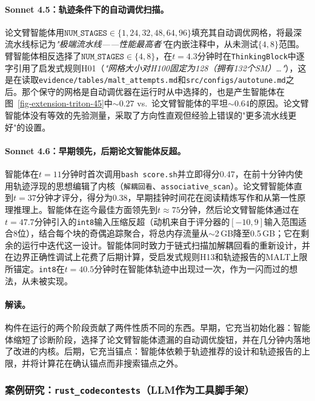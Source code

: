 \paragraph{Sonnet 4.5：轨迹条件下的自动调优扫描。}
论文臂智能体用$\texttt{NUM\_STAGES} \in \{1, 24, 32, 48, 64, 96\}$填充其自动调优网格，将最深流水线标记为\emph{"极端流水线——性能最高者"}在内嵌注释中，从未测试$\{4, 8\}$范围。\ara{}臂智能体相反选择了$\texttt{NUM\_STAGES} \in \{4, 8\}$，在$t = 4.3$分钟时在\texttt{ThinkingBlock}中逐字引用了启发式规则H01（\emph{"网格大小对H100固定为128（拥有132个SM）…"}），这是在读取\texttt{evidence/tables/malt\_attempts.md}和\texttt{src/configs/autotune.md}之后。那个保守的网格是自动调优器在运行时从中选择的，也是产生\ara{}智能体在图~\ref{fig-extension-triton-45}中$\sim 0.27$ vs.\ 论文臂智能体的平坦$\sim 0.64$的原因。论文臂智能体没有等效的先验测量，采取了方向性直观但经验上错误的"更多流水线更好"的设置。

\paragraph{Sonnet 4.6：早期领先，后期论文智能体反超。}
\ara{}智能体在$t = 11$分钟时首次调用\texttt{bash score.sh}并立即得分0.47，在前十分钟内使用轨迹浮现的思想编辑了内核（\texttt{解耦回看}、\texttt{associative\_scan}）。论文臂智能体直到$t = 37$分钟才评分，得分为0.38，早期挂钟时间花在阅读精炼写作和从第一性原理推理上。\ara{}智能体在迄今最佳方面领先到$t \approx 75$分钟，然后论文臂智能体通过在$t = 47.7$分钟引入的\texttt{int8}输入压缩反超（动机来自于评分器的$[-10, 9]$输入范围适合8位），结合每个块的奇偶追踪聚合，将总内存流量从$\sim$2\,GB降至0.5\,GB；它在剩余的运行中迭代这一设计。\ara{}智能体同时致力于链式扫描加解耦回看的重新设计，并在边界正确性调试上花费了后期计算，受启发式规则H13和轨迹报告的MALT上限所锚定。\texttt{int8}在$t = 40.5$分钟时在\ara{}智能体轨迹中出现过一次，作为一闪而过的想法，从未被实现。

\paragraph{解读。}
\ara{}构件在运行的两个阶段贡献了两件性质不同的东西。早期，它充当初始化器：智能体缩短了诊断阶段，选择了论文臂智能体遗漏的自动调优旋钮，并在几分钟内落地了改进的内核。后期，它充当锚点：智能体依赖于轨迹推荐的设计和轨迹报告的上限，并将计算花在确认锚点而非搜索锚点之外。

\subsubsection{案例研究：\texttt{rust\_codecontests}（LLM作为工具脚手架）}
\label{sec-eval-extension-rust}

